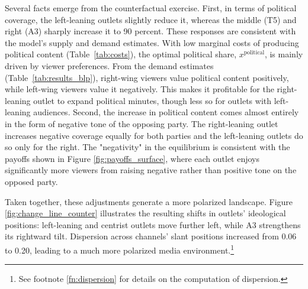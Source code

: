 \documentclass[12pt]{article}
\begin{document}


Several facts emerge from the counterfactual exercise. First, in terms of political coverage, the left-leaning outlets slightly reduce it, whereas the middle (T5) and right (A3) sharply increase it to 90 percent. These responses are consistent with the model’s supply and demand estimates. With low marginal costs of producing political content (Table~\ref{tab:costs}), the optimal political share, $x^{\text{political}}$, is mainly driven by viewer preferences. From the demand estimates (Table~\ref{tab:results_blp}), right-wing viewers value political content positively, while left-wing viewers value it negatively. This makes it profitable for the right-leaning outlet to expand political minutes, though less so for outlets with left-leaning audiences. Second, the increase in political content comes almost entirely in the form of negative tone of the opposing party. The right-leaning outlet increases negative coverage equally for both parties and the left-leaning outlets do so only for the right. The "negativity" in the equilibrium is consistent with the payoffs shown in Figure \ref{fig:payoffs_surface}, where each outlet enjoys significantly more viewers from raising negative rather than positive tone on the opposed party. 



Taken together, these adjustments generate a  more polarized landscape. Figure \ref{fig:change_line_counter} illustrates the resulting shifts in outlets’ ideological positions: left-leaning and centrist outlets move further left, while A3 strengthens its rightward tilt. Dispersion across channels' slant positions increased from 0.06 to 0.20, leading to a much more polarized media environment.\footnote{See footnote \ref{fn:dispersion} for details on the computation of dispersion.}
\end{document}
